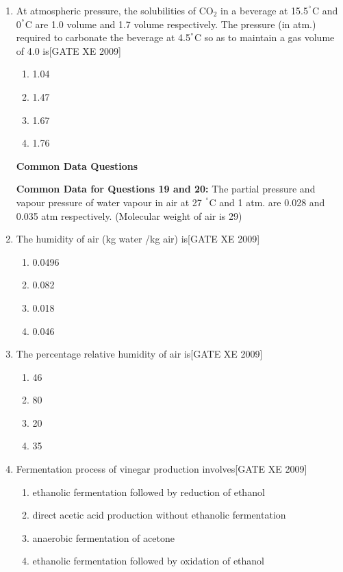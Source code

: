 \documentclass[journal,12pt,onecolumn]{IEEEtran}
\theoremstyle{remark}
\begin{document}
\begin{enumerate}
\item At atmospheric pressure, the solubilities of CO$_2$ in a beverage at 15.5$^\degree$C and 0$^\degree$C are 1.0 volume and 1.7 volume respectively. The pressure (in atm.) required to carbonate the beverage at 4.5$^\degree$C so as to maintain a gas volume of 4.0 is\hfill[GATE XE 2009]

\begin{multicols}{2}
\begin{enumerate}
\item 1.04
\item 1.47
\item 1.67
\item 1.76
\end{enumerate}
\end{multicols}


\noindent\textbf{Common Data Questions}

\noindent\textbf{Common Data for Questions 19 and 20:}
The partial pressure and vapour pressure of water vapour in air at 27 $^\degree$C and 1 atm. are 0.028 and 0.035 atm respectively. (Molecular weight of air is 29)

\item The humidity of air (kg water /kg air) is\hfill[GATE XE 2009]

\begin{multicols}{2}
\begin{enumerate}
\item 0.0496
\item 0.082
\item 0.018
\item 0.046
\end{enumerate}
\end{multicols}

\item The percentage relative humidity of air is\hfill[GATE XE 2009]

\begin{multicols}{2}
\begin{enumerate}
\item 46
\item 80
\item 20
\item 35
\end{enumerate}
\end{multicols}

\item Fermentation process of vinegar production involves\hfill[GATE XE 2009]

\begin{multicols}{2}
\begin{enumerate}
\item ethanolic fermentation followed by reduction of ethanol
\item direct acetic acid production without ethanolic fermentation
\item anaerobic fermentation of acetone
\item ethanolic fermentation followed by oxidation of ethanol
\end{enumerate}
\end{multicols}


\end{enumerate}
\end{document}
